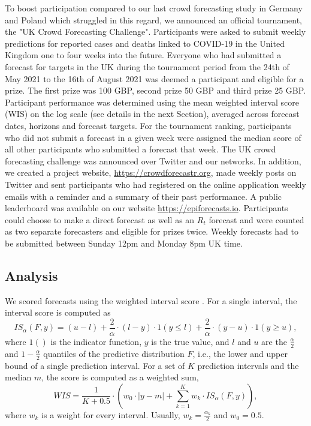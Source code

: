 \documentclass[10pt,a4paper,twocolumn]{article}
\begin{document}
To boost participation compared to our last crowd forecasting study in Germany and Poland \citep{bosseComparingHumanModelbased2022} which struggled in this regard, we announced an official tournament, the "UK Crowd Forecasting Challenge". Participants were asked to submit weekly predictions for reported cases and deaths linked to COVID-19 in the United Kingdom one to four weeks into the future. Everyone who had submitted a forecast for targets in the UK during the tournament period from the 24th of May 2021 to the 16th of August 2021 was deemed a participant and eligible for a prize. The first prize was 100 GBP, second prize 50 GBP and third prize 25 GBP. Participant performance was determined using the mean weighted interval score (WIS) on the log scale (see details in the next Section), %
averaged across forecast dates, horizons and forecast targets. For the tournament ranking, participants who did not submit a forecast in a given week were assigned the median score of all other participants who submitted a forecast that week. The UK crowd forecasting challenge was announced over Twitter and our networks. 
In addition, we created a project website, \url{https://crowdforecastr.org}, made weekly posts on Twitter and sent participants who had registered on the online application weekly emails with a reminder and a summary of their past performance. A public leaderboard was available on our website \url{https://epiforecasts.io}. Participants could choose to make a direct forecast as well as an $R_t$ forecast and were counted as two separate forecasters and eligible for prizes twice. Weekly forecasts had to be submitted between Sunday 12pm and Monday 8pm UK time. 


\subsection*{Analysis}
\label{sec:analysis}

We scored forecasts using the weighted interval score
\cite{bracherEvaluatingEpidemicForecasts2021}. For a single interval, the interval score is computed as 
  $$IS_\alpha(F,y) = (u-l) + \frac{2}{\alpha} \cdot (l-y) \cdot 1(y \leq l) + \frac{2}{\alpha} \cdot (y-u) \cdot 1(y \geq u), $$ 
  where $1()$ is the indicator function, $y$ is the true value, and $l$ and $u$ are the $\frac{\alpha}{2}$ and $1 - \frac{\alpha}{2}$ quantiles of the predictive distribution $F$, i.e., the lower and upper bound of a single prediction interval. For a set of $K$ prediction intervals and the median $m$, the score is computed as a weighted sum, 
  $$WIS = \frac{1}{K + 0.5} \cdot \left( w_0 \cdot |y - m| + \sum_{k = 1}^{K} w_k \cdot IS_{\alpha}(F, y) \right), $$
  where $w_k$ is a weight for every interval. Usually, $w_k = \frac{\alpha_k}{2}$ and $w_0 = 0.5$. 
\end{document}
